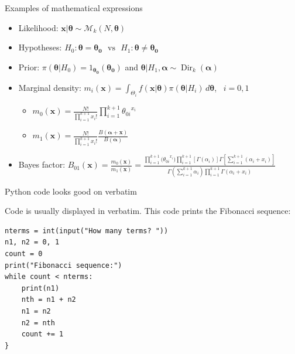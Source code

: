 \begin{frame}{Examples of mathematical expressions}

\begin{itemize}

\item Likelihood: $\bm{x}|\bm{\theta} \sim \mathcal{M}_k(N,\bm{\theta})$

\item Hypotheses:  $ H_0: \bm{\theta}=\bm{\theta_0} \,\,\,\, \text{vs} \,\,\,\,  H_1: \bm{\theta} \neq \bm{\theta_0}$

\item Prior: $\pi(\bm{\theta}|H_0)={1_{\bm{\theta_0}}(\bm{\theta_0})}$ and $\bm{\theta}|H_1, \bm{\alpha} \sim \operatorname{Dir}_k(\bm{\alpha})$ 

\item Marginal density: $m_i(\bm{x})=\int_{\Theta_i} f(\bm{x}|\bm{\theta})\pi(\bm{\theta}|H_i) \, d\bm{\theta} $, \, $i=0,1$

\begin{itemize}

\item  $m_0(\bm{x})=\frac{N!}{\prod_{i=1}^{k+1}x_i!}\prod_{i=1}^{k+1}{\theta_{0i}}^{x_i}$ 
\item  $m_1(\bm{x})= \frac{N!}{\prod_{i=1}^{k+1}x_i!}\frac{B(\bm{\alpha}+\bm{x})}{B(\bm{\alpha})}$ 

\end{itemize}

\item Bayes factor: $B_{01}(\bm{x}) = \frac{m_0(\bm{x})}{m_1(\bm{x})} = \frac{\prod_{i=1}^{k+1}{(\theta_{0i}}^{x_i}) \prod_{i=1}^{k+1}[\Gamma(\alpha_i)] \Gamma [\sum_{i=1}^{k+1}(\alpha_i+x_i)]}{\Gamma(\sum_{i=1}^{k+1} \alpha_i) \prod_{i=1}^{k+1}\Gamma(\alpha_i+x_i)}$

\end{itemize}

\end{frame}


\begin{frame}[fragile]{Python code looks good on verbatim}

Code is usually displayed in verbatim. This code prints the Fibonacci sequence:

\begin{verbatim}
nterms = int(input("How many terms? "))
n1, n2 = 0, 1
count = 0
print("Fibonacci sequence:")
while count < nterms:
    print(n1)
    nth = n1 + n2
    n1 = n2
    n2 = nth
    count += 1
}
\end{verbatim}

\end{frame}

